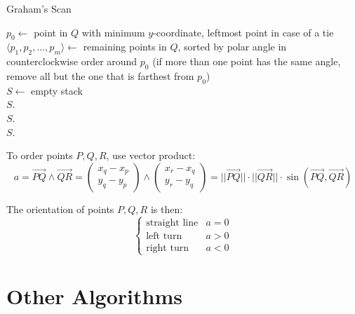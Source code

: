 \documentclass[a4paper, 12pt]{article}
\begin{document}
\IncMargin{2em}
\begin{algorithm}[H]
\caption{Graham's Scan}
\vspace{0.1cm}
\Indm
{}
\Indp
\vspace{0.1cm}
$p_0 \gets$ point in $Q$ with minimum $y$-coordinate, leftmost point in case of a tie\\
  $\langle p_1, p_2, ..., p_m\rangle\gets$ remaining points in $Q$, sorted by polar angle in counterclockwise order around $p_0$ (if more than one point has the same angle, remove all but the one that is farthest from $p_0$)\\
$S\gets$ empty stack\\
$S$.\\
$S$.\\
$S$.\\
\end{algorithm}
\DecMargin{2em}
\vspace{0.5cm}

To order points $P, Q, R$, use vector product: $$a = \overrightarrow{PQ}\wedge\overrightarrow{QR} = \left(\begin{array}{c}x_q - x_p\\y_q - y_p\end{array}\right)\wedge\left(\begin{array}{c}x_r - x_q\\y_r - y_q\end{array}\right) = ||\overrightarrow{PQ}||\cdot||\overrightarrow{QR}||\cdot\sin(\overrightarrow{PQ}, \overrightarrow{QR})$$

The orientation of points $P, Q, R$ is then:
$$\left\{\begin{array}{ll}\text{straight line} & a = 0\\ \text{left turn} & a > 0\\ \text{right turn} & a < 0\end{array}\right.$$

\section{Other Algorithms}
\end{document}
